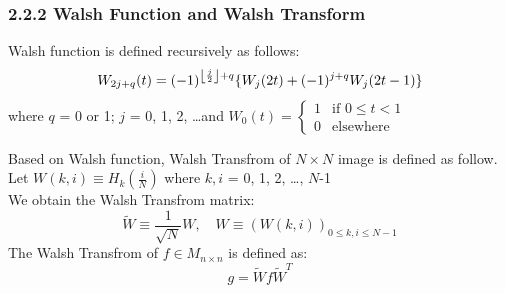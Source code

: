 \documentclass[12pt]{article}
\DeclarePairedDelimiter\floor{\lfloor}{\rfloor}
\begin{document}
\subsubsection*{2.2.2 \quad Walsh Function and Walsh Transform}
Walsh function is defined recursively as follows: 
\begin{equation*}
    W_{2j+q}(t) = (-1)^{\floor*{\frac{j}{2}}+q} \{W_j(2t)+(-1)^{j+q}W_j(2t-1)\}
\end{equation*} 
where $q$ = 0 or 1; $j$ = 0, 1, 2, \dots and $W_0(t) = \begin{cases}
        1 & \text{if $0 \leq t < 1$}\\
        0 & \text{elsewhere}
    \end{cases}$\\
\begin{flushleft}
Based on Walsh function, Walsh Transfrom of $N\times N$ image is defined as follow.\\
Let $W(k,i) \equiv H_{k}\left(\frac{i}{N}\right)$ where $k,i$ = 0, 1, 2, \ldots, $N$-1 \\
We obtain the Walsh Transfrom matrix:
\begin{equation*}
 \tilde{W} \equiv\frac{1}{\sqrt{N}}W, \quad W \equiv(W (k,i))_{0\leqslant k,i \leqslant N-1}
\end{equation*}
The Walsh Transfrom of $f \in M_{n\times n}$ is defined as:
\begin{equation*}
    g = \tilde{W}f\tilde{W}^T
\end{equation*}
\end{flushleft} 
\end{document}
